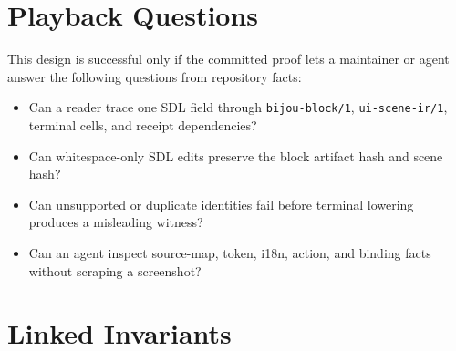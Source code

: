 \section{Playback Questions}\label{record-140-playback-questions}

This design is successful only if the committed proof lets a maintainer or agent answer the following questions from repository facts:

\begin{itemize}
\tightlist
\item
  Can a reader trace one SDL field through \texttt{b\allowbreak{}i\allowbreak{}j\allowbreak{}o\allowbreak{}u\allowbreak{}-\allowbreak{}b\allowbreak{}l\allowbreak{}o\allowbreak{}c\allowbreak{}k\allowbreak{}/\allowbreak{}1}, \texttt{u\allowbreak{}i\allowbreak{}-\allowbreak{}s\allowbreak{}c\allowbreak{}e\allowbreak{}n\allowbreak{}e\allowbreak{}-\allowbreak{}i\allowbreak{}r\allowbreak{}/\allowbreak{}1}, terminal cells, and receipt dependencies?
\item
  Can whitespace-only SDL edits preserve the block artifact hash and scene hash?
\item
  Can unsupported or duplicate identities fail before terminal lowering produces a misleading witness?
\item
  Can an agent inspect source-map, token, i18n, action, and binding facts without scraping a screenshot?
\end{itemize}

\section{Linked Invariants}\label{record-140-linked-invariants}


